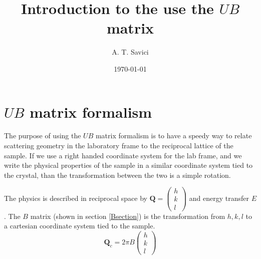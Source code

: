 \documentclass[prb]{revtex4}%
\begin{document}

\title{Introduction to the use the $UB$ matrix} %

\author{A. T. Savici}


\date{\today}%



\maketitle

\section{$UB$ matrix formalism}

The purpose of using the $UB$ matrix formalism is to have a speedy way
to relate scattering geometry in the laboratory frame to the
reciprocal lattice of the sample. If we use a right handed coordinate
system for the lab frame, and we write the physical properties of the
sample in a similar coordinate system tied to the crystal, than the
transformation between the two is a simple rotation.

The physics is described in reciprocal space by $\textbf{Q} = \left(\begin{array}{c}
                                                            h \\
                                                            k \\
                                                            l
                                                          \end{array}\right)$
and energy transfer $E$. The $B$ matrix (shown in section \ref{Bsection}) is the transformation
from $h, k, l$ to a cartesian coordinate system tied to the sample.
\begin{equation}
    \textbf{Q}_c=2 \pi B \left(\begin{array}{c}
                                                            h \\
                                                            k \\
                                                            l
                                                          \end{array}\right)
\end{equation}
\end{document}
